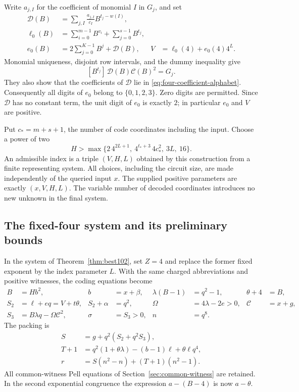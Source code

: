 Write $a_{j,I}$ for the coefficient of monomial $I$ in $G_j$, and set
\begin{align*}
 \mathcal D(B)&=\sum_{j,I}\frac{a_{j,I}}{c_I}B^{t_j-w(I)},\\
 \ell_0(B)&=\sum_{i=0}^{m-1}B^{v_i}+\sum_{j=0}^{s-1}B^{t_j},\\
 e_0(B)&=2\sum_{j=0}^{K-1}B^j+\mathcal D(B),&
 V&=\ell_0(4)+e_0(4)4^L.
\end{align*}
Monomial uniqueness, disjoint row intervals, and the dummy inequality
give
\begin{equation}\label{eq:four-coefficient-identity}
 [B^{t_j}]\,\mathcal D(B)\mathcal C(B)^2=G_j.
\end{equation}
They also show that the coefficients of $\mathcal D$ lie in
\eqref{eq:four-coefficient-alphabet}. Consequently all digits of $e_0$
belong to $\{0,1,2,3\}$. Zero digits are permitted. Since $\mathcal D$
has no constant term, the unit digit of $e_0$ is exactly $2$; in
particular $e_0$ and $V$ are positive.

Put $c_*=m+s+1$, the number of code coordinates including the input.
Choose a power of two
\begin{equation}\label{eq:four-index-bound}
 H>\max\{2\,4^{2L+1},\ 4^{t_*+3}\,4c_*^2,\ 3L,\ 16\}.
\end{equation}
An admissible index is a triple $(V,H,L)$ obtained by this construction
from a finite representing system. All choices, including the circuit
size, are made independently of the queried input $x$. The supplied
positive parameters are exactly $(x,V,H,L)$. The variable number of
decoded coordinates introduces no new unknown in the final system.

\subsection{The fixed-four system and its preliminary bounds}

In the system of Theorem~\ref{thm:best102}, set $Z=4$ and replace the
former fixed exponent by the index parameter $L$. With the same charged
abbreviations and positive witnesses, the coding equations become
\begin{align*}
 B&=Hb^2,& b&=x+\beta,& \lambda(B-1)&=q^2-1,& \theta+4&=B,\\
 S_2&=\ell+eq=V+t\theta,& S_2+\alpha&=q^2,&
 \Omega&=4\lambda-2e>0,&\mathcal C&=x+g,\\
 S_3&=B\lambda q-\Omega\mathcal C^2,& \sigma&=S_3>0,&n&=q^8.
\end{align*}
The packing is
\begin{align*}
 S&=g+q^2(S_2+q^2S_3),\\
 T+1&=q^2(1+\theta\lambda)-(b-1)\ell+\theta\ell q^4,\\
 r&=S(n^2-n)+(T+1)(n^2-1).
\end{align*}
All common-witness Pell equations of Section~\ref{sec:common-witness}
are retained. In the second exponential congruence the expression
$a-(B-4)$ is now $a-\theta$.

